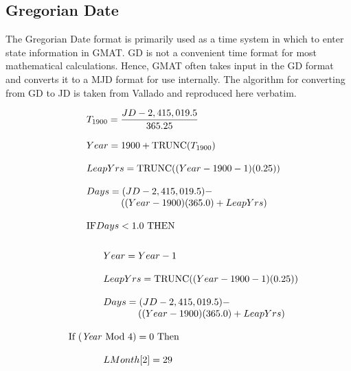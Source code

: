 \subsection{Gregorian Date}\label{Sec:GregorianDateFormat}

The Gregorian Date format is primarily used as a time system in
which to enter state information in GMAT.  GD is not a convenient
time format for most mathematical calculations.  Hence, GMAT often
takes input in the GD format and converts it to a MJD format for
use internally.  The algorithm for converting from GD to JD is
taken from Vallado\cite{vallado2} and reproduced here verbatim.

\begin{equation}
\begin{array}{llll}
      & T_{1900} = \displaystyle\frac{JD - 2,415,019.5}{365.25}\\
      & \\
      & Year = 1900 + \mbox{TRUNC}(T_{1900}) \\
      & \\
      & LeapYrs = \mbox{TRUNC}((Year - 1900 - 1)(0.25))\\
      & \\
      & Days = (JD - 2,415,019.5) - \\
      & \hspace{.5 in}((Year - 1900)(365.0) +
               LeapYrs)\\
      & \\
      & \mbox{IF} Days < 1.0 \mbox{ THEN}
      \end{array}\nonumber
\end{equation}
%
\begin{equation}
     \begin{array}{llll}
      & \\
      & \hspace{.5 in} Year = Year - 1 \\
      &  \\
      & \hspace{.5 in} LeapYrs = \mbox{TRUNC}((Year - 1900 - 1)(0.25))\\
      & \\
      & \hspace{.5 in}Days = (JD - 2,415,019.5) - \\
      & \hspace{1 in}((Year - 1900)(365.0) +
               LeapYrs)\\
      & \\
      & \mbox{If (\emph{Year} Mod 4)} = 0 \mbox{ Then} \\
      & \\
      &  \hspace{.5 in} LMonth[2] = 29 \\
       \end{array}\nonumber
\end{equation}
